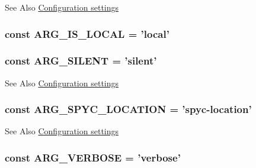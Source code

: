 \begin{DoxySeeAlso}{See Also}
\hyperlink{group__config}{Configuration settings} 
\end{DoxySeeAlso}
\hypertarget{group__args_gab4bc1e3dae7e4e4c739fd5f257a43aae}{
\subsubsection[{A\-R\-G\-\_\-\-I\-S\-\_\-\-L\-O\-C\-A\-L}]{\setlength{\rightskip}{0pt plus 5cm}const A\-R\-G\-\_\-\-I\-S\-\_\-\-L\-O\-C\-A\-L = 'local'}}\label{group__args_gab4bc1e3dae7e4e4c739fd5f257a43aae}
\hypertarget{group__args_gafd7c5af186098f8c54f92f6a0f5ff23c}{
\subsubsection[{A\-R\-G\-\_\-\-S\-I\-L\-E\-N\-T}]{\setlength{\rightskip}{0pt plus 5cm}const A\-R\-G\-\_\-\-S\-I\-L\-E\-N\-T = 'silent'}}\label{group__args_gafd7c5af186098f8c54f92f6a0f5ff23c}
\begin{DoxySeeAlso}{See Also}
\hyperlink{group__config}{Configuration settings} 
\end{DoxySeeAlso}
\hypertarget{group__args_ga73d8fbeb725231563d894795457b1adf}{
\subsubsection[{A\-R\-G\-\_\-\-S\-P\-Y\-C\-\_\-\-L\-O\-C\-A\-T\-I\-O\-N}]{\setlength{\rightskip}{0pt plus 5cm}const A\-R\-G\-\_\-\-S\-P\-Y\-C\-\_\-\-L\-O\-C\-A\-T\-I\-O\-N = 'spyc-\/location'}}\label{group__args_ga73d8fbeb725231563d894795457b1adf}
\begin{DoxySeeAlso}{See Also}
\hyperlink{group__config}{Configuration settings} 
\end{DoxySeeAlso}
\hypertarget{group__args_gac79062d79c803c74aee0337d9637f574}{
\subsubsection[{A\-R\-G\-\_\-\-V\-E\-R\-B\-O\-S\-E}]{\setlength{\rightskip}{0pt plus 5cm}const A\-R\-G\-\_\-\-V\-E\-R\-B\-O\-S\-E = 'verbose'}}\label{group__args_gac79062d79c803c74aee0337d9637f574}
